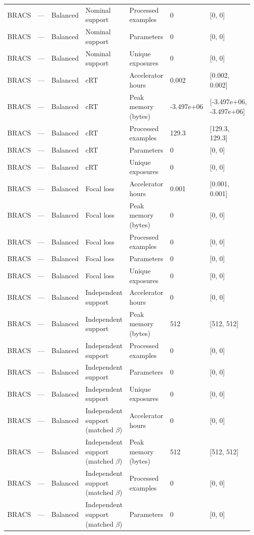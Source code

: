 \begin{longtable}{lllllll}
BRACS & --- & Balanced & Nominal support & Processed examples & 0 & [0, 0] \\
BRACS & --- & Balanced & Nominal support & Parameters & 0 & [0, 0] \\
BRACS & --- & Balanced & Nominal support & Unique exposures & 0 & [0, 0] \\
BRACS & --- & Balanced & cRT & Accelerator hours & 0.002 & [0.002, 0.002] \\
BRACS & --- & Balanced & cRT & Peak memory (bytes) & -3.497e+06 & [-3.497e+06, -3.497e+06] \\
BRACS & --- & Balanced & cRT & Processed examples & 129.3 & [129.3, 129.3] \\
BRACS & --- & Balanced & cRT & Parameters & 0 & [0, 0] \\
BRACS & --- & Balanced & cRT & Unique exposures & 0 & [0, 0] \\
BRACS & --- & Balanced & Focal loss & Accelerator hours & 0.001 & [0.001, 0.001] \\
BRACS & --- & Balanced & Focal loss & Peak memory (bytes) & 0 & [0, 0] \\
BRACS & --- & Balanced & Focal loss & Processed examples & 0 & [0, 0] \\
BRACS & --- & Balanced & Focal loss & Parameters & 0 & [0, 0] \\
BRACS & --- & Balanced & Focal loss & Unique exposures & 0 & [0, 0] \\
BRACS & --- & Balanced & Independent support & Accelerator hours & 0 & [0, 0] \\
BRACS & --- & Balanced & Independent support & Peak memory (bytes) & 512 & [512, 512] \\
BRACS & --- & Balanced & Independent support & Processed examples & 0 & [0, 0] \\
BRACS & --- & Balanced & Independent support & Parameters & 0 & [0, 0] \\
BRACS & --- & Balanced & Independent support & Unique exposures & 0 & [0, 0] \\
BRACS & --- & Balanced & Independent support (matched $\beta$) & Accelerator hours & 0 & [0, 0] \\
BRACS & --- & Balanced & Independent support (matched $\beta$) & Peak memory (bytes) & 512 & [512, 512] \\
BRACS & --- & Balanced & Independent support (matched $\beta$) & Processed examples & 0 & [0, 0] \\
BRACS & --- & Balanced & Independent support (matched $\beta$) & Parameters & 0 & [0, 0] \\

\end{longtable}
